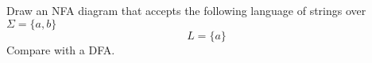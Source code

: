 Draw an NFA diagram that accepts the following
language of strings over $\Sigma =
\{ a, b \}$ 
\[
L = \{a\}
\]
Compare with a DFA.
